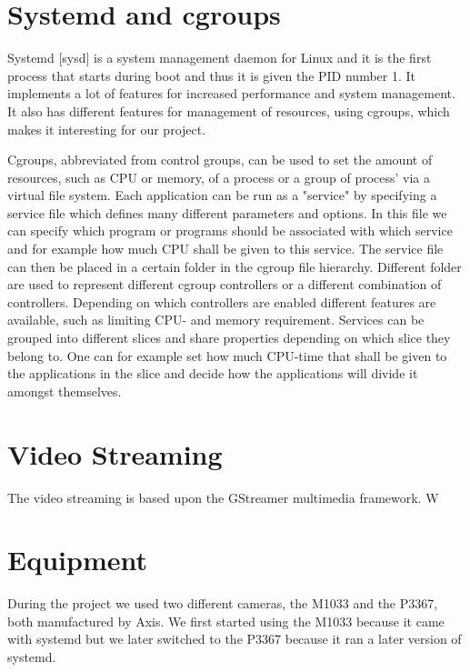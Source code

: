 \documentclass{LTHthesis}
\begin{document}
\section{Systemd and cgroups}
Systemd [sysd] is a system management daemon for Linux and it is the first process that starts during boot and thus it is given the PID number 1. It implements a lot of features for increased performance and system management. It also has different features for management of resources, using cgroups, which makes it interesting for our project. 

Cgroups, abbreviated from control groups, can be used to set the amount of resources, such as CPU or memory, of a process or a group of process' via a virtual file system. Each application can be run as a "service" by specifying a service file which defines many different parameters and options. In this file we can specify which program or programs should be associated with which service and for example how much CPU shall be given to this service. The service file can then be placed in a certain folder in the cgroup file hierarchy. Different folder are used to represent different cgroup controllers or a different combination of controllers. Depending on which controllers are enabled different features are available, such as limiting CPU- and memory requirement. Services can be grouped into different slices and share properties depending on which slice they belong to. One can for example set how much CPU-time that shall be given to the applications in the slice and decide how the applications will divide it amongst themselves.

\section{Video Streaming}
The video streaming is based upon the GStreamer multimedia framework. W

\section{Equipment} %
During the project we used two different cameras, the M1033 and the P3367, both manufactured by Axis. We first started using the M1033 because it came with systemd but we later switched to the P3367 because it ran a later version of systemd.
\end{document}
